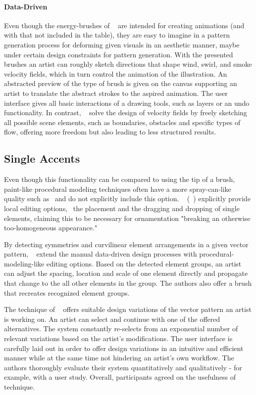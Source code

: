 \paragraph*{Data-Driven}
Even though the energy-brushes of \citeauthor*{xing_2016_eit}~\cite{xing_2016_eit} are intended for creating animations (and with that not included in the table), they are easy to imagine in a pattern generation process for deforming given visuals in an aesthetic manner, maybe under certain design constraints for pattern generation. With the presented brushes an artist can roughly sketch directions that shape wind, swirl, and smoke velocity fields, which in turn control the animation of the illustration. An abstracted preview of the type of brush is given on the canvas supporting an artist to translate the abstract strokes to the aspired animation. The user interface gives all basic interactions of a drawing tools, such as layers or an undo functionality. In contrast, \citeauthor*{hu_2019_ssf}~\cite{hu_2019_ssf} solve the design of velocity fields by freely sketching all possible scene elements, such as boundaries, obstacles and specific types of flow, offering more freedom but also leading to less structured results. 


\subsection{Single Accents}
\label{subsubsec:analysis_single_accents}

Even though this functionality can be compared to using the tip of a brush, paint-like procedural modeling techniques often have a more spray-can-like quality such as~\cite{mech_2012_tdf} and do not explicitly include this option. \citeauthor*{gieseke_2017_ooo}~\cite{gieseke_2017_ooo} (~) explicitly provide local editing options, \eg~the placement and the dragging and dropping of single elements, claiming this to be necessary for ornamentation "breaking an otherwise too-homogeneous appearance."

By detecting symmetries and curvilinear element arrangements in a given vector pattern, \citeauthor*{yeh_2009_dsa}~\cite{yeh_2009_dsa} extend the manual data-driven design processes with procedural-modeling-like editing options. Based on the detected element groups, an artist can adjust the spacing, location and scale of one element directly and propagate that change to the all other elements in the group. The authors also offer a brush that recreates recognized element groups.

The technique of \citeauthor*{guerrero_2016_pep}~\cite{guerrero_2016_pep} offers suitable design variations of the vector pattern an artist is working on. An artist can select and continue with one of the offered alternatives. The system constantly re-selects from an exponential number of relevant variations based on the artist's modifications. The user interface is carefully laid out in order to offer design variations in an intuitive and efficient manner while at the same time not hindering an artist's own workflow. The authors thoroughly evaluate their system quantitatively and qualitatively - for example, with a user study. Overall, participants agreed on the usefulness of technique.